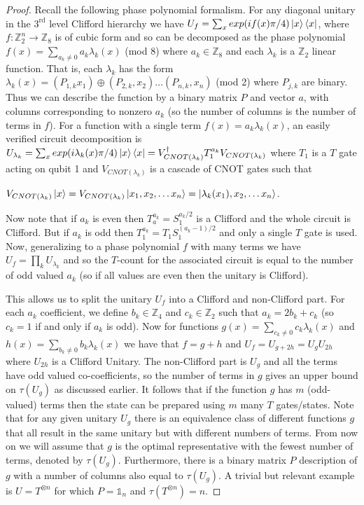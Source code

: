 \documentclass[12pt]{dalthesis}
\begin{document}
\begin{proof}
Recall the following phase polynomial formalism. For any diagonal unitary in the $3^{\text{rd}}$ level Clifford hierarchy we have $U_f = \sum_x exp(if(x) \pi/4) \ket{x}\bra{x}$, where $f:\mathbb{Z}_2^n \rightarrow \mathbb{Z}_8$ is of cubic form and so can be decomposed as the phase polynomial $f(x) = \sum_{a_k \neq 0} a_k \lambda_k (x)$ (mod 8) where $a_k \in \mathbb{Z}_8$ and each $\lambda_k$ is a $\mathbb{Z}_2$ linear function. That is, each $\lambda_k$ has the form $\lambda_k (x) = (P_{1, k}x_1) \oplus (P_{2, k}, x_2) \dots (P_{n, k}, x_n)$ (mod 2) where $P_{j, k}$ are binary. Thus we can describe the function by a binary matrix $P$ and vector $a$, with columns corresponding to nonzero $a_k$ (so the number of columns is the number of terms in $f$). For a function with a single term $f(x) = a_k \lambda_k(x)$, an easily verified circuit decomposition is 
$U_{\lambda_k} = \sum_x exp(i\lambda_k(x) \pi/4) \ket{x}\bra{x} = V^{\dag}_{CNOT(\lambda_k)}T_1^{a_k}V_{CNOT(\lambda_k)}$ where $T_1$ is a $T$ gate acting on qubit 1 and $V_{CNOT(\lambda_k)}$ is a cascade of CNOT gates such that 

$V_{CNOT(\lambda_k)} \ket{x} = V_{CNOT(\lambda_k)} \ket{x_1, x_2, \dots x_n} = \ket{\lambda_k(x_1), x_2, \dots x_n}$.

Now note that if $a_k$ is even then $T_a^{a_k} = S_1^{a_k/2}$ is a Clifford and the whole circuit is Clifford. But if $a_k$ is odd then $T_1^{a_k} = T_1S_1^{(a_k - 1)/2}$ and only a single $T$ gate is used. Now, generalizing to a phase polynomial $f$ with many terms we have $U_f = \displaystyle \prod_k U_{\lambda_k}$  and so the $T$-count for the associated circuit is equal to the number of odd valued $a_k$ (so if all values are even then the unitary is Clifford).


This allows us to split the unitary $U_f$ into a Clifford and non-Clifford part. For each $a_k$ coefficient, we define $b_k \in \mathbb{Z}_4$ and $c_k \in \mathbb{Z}_2$ such that $a_k = 2b_k +c_k$ (so $c_k = 1$ if and only if $a_k$ is odd). Now for functions $g(x) = \displaystyle \sum_{c_k \neq 0} c_k \lambda_k(x)$ and $h(x) = \displaystyle \sum_{b_k \neq 0} b_k \lambda_k(x)$ we have that $f = g + h$ and $U_f = U_{g+2h} = U_gU_{2h}$ where $U_{2h}$ is a Clifford Unitary. The non-Clifford part is $U_g$ and all the terms have odd valued co-coefficients, so the number of terms in $g$ gives an upper bound on $\tau(U_g)$ as discussed earlier. It follows that if the function $g$ has $m$ (odd-valued) terms then the state can be prepared using $m$ many $T$ gates/states. Note that for any given unitary $U_g$ there is an equivalence class of different functions $g$ that all result in the same unitary but with different numbers of terms. From now on we will assume that $g$ is the optimal representative with the fewest number of terms, denoted by $\tau(U_g)$. Furthermore, there is a binary matrix $P$ description of $g$ with a number of columns also equal to $\tau (U_g)$. A trivial but relevant example is $U = T^{\otimes n}$ for which $P = \mathds{1}_n$ and $\tau (T^{\otimes n}) = n$.


\end{proof}
\end{document}
